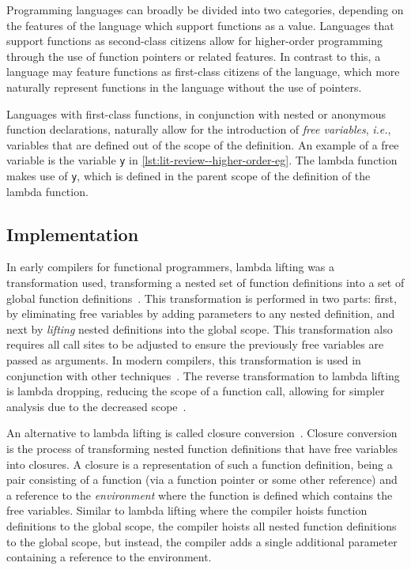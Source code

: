Programming languages can broadly be divided into two categories, depending on the features of the language which support functions as a value. Languages that support functions as second-class citizens allow for higher-order programming through the use of function pointers or related features. In contrast to this, a language may feature functions as first-class citizens of the language, which more naturally represent functions in the language without the use of pointers. 

Languages with first-class functions, in conjunction with nested or anonymous function declarations, naturally allow for the introduction of \textit{free variables}, \textit{i.e.}, variables that are defined out of the scope of the definition. An example of a free variable is the variable \texttt{y} in \cref{lst:lit-review--higher-order-eg}. The lambda function makes use of \texttt{y}, which is defined in the parent scope of the definition of the lambda function.

\subsection{Implementation}
\label{ssection:lit-review--impln}

In early compilers for functional programmers, lambda lifting was a transformation used, transforming a nested set of function definitions into a set of global function definitions~\cite{johnsson1985lambda}. This transformation is performed in two parts: first, by eliminating free variables by adding parameters to any nested definition, and next by \textit{lifting} nested definitions into the global scope. This transformation also requires all call sites to be adjusted to ensure the previously free variables are passed as arguments. In modern compilers, this transformation is used in conjunction with other techniques~\cite{leissa2015graph}. The reverse transformation to lambda lifting is lambda dropping, reducing the scope of a function call, allowing for simpler analysis due to the decreased scope~\cite{danvy1997lambda}. 

An alternative to lambda lifting is called closure conversion~\cite{landin1964mechanical, steele1978rabbit}. Closure conversion is the process of transforming nested function definitions that have free variables into closures. A closure is a representation of such a function definition, being a pair consisting of a function (via a function pointer or some other reference) and a reference to the \textit{environment} where the function is defined which contains the free variables. Similar to lambda lifting where the compiler hoists function definitions to the global scope, the compiler hoists all nested function definitions to the global scope, but instead, the compiler adds a single additional parameter containing a reference to the environment.

